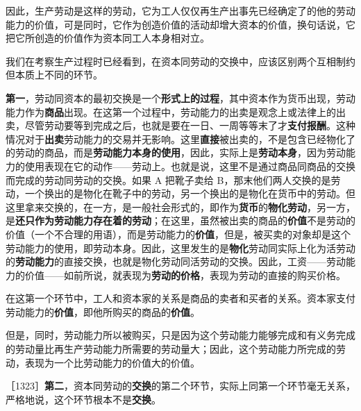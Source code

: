 因此，生产劳动是这样的劳动，它为工人仅仅再生产出事先已经确定了的他的劳动能力的价值，可是同时，它作为创造价值的活动却增大资本的价值，换句话说，它把它所创造的价值作为资本同工人本身相对立。


我们在考察生产过程时已经看到，在资本同劳动的交换中，应该区别两个互相制约但本质上不同的环节。

\textbf{第一}，劳动同资本的最初交换是一个\textbf{形式上的过程}，其中资本作为货币出现，劳动能力作为\textbf{商品}出现。在这第一个过程中，劳动能力的出卖是观念上或法律上的出卖，尽管劳动要等到完成之后，也就是要在一日、一周等等末了才\textbf{支付报酬}。这种情况对于\textbf{出卖}劳动能力的交易并无影响。这里\textbf{直接}被出卖的，不是包含已经物化了的劳动的商品，而是\textbf{劳动能力本身的使用}，因此，实际上是\textbf{劳动本身}，因为劳动能力的使用表现在它的动作——劳动上。也就是说，这里不是通过商品同商品的交换而完成的劳动同劳动的交换。如果 A 把靴子卖给 B，那末他们两人交换的是劳动，一个换出的是物化在靴子中的劳动，另一个换出的是物化在货币中的劳动。但这里拿来交换的，在一方，是一般社会形式的，即作为\textbf{货币}的\textbf{物化劳动}，另一方，是\textbf{还只作为劳动能力存在着的劳动}；在这里，虽然被出卖的商品的\textbf{价值}不是劳动的价值（一个不合理的用语），而是劳动能力的\textbf{价值}，但是，被买卖的对象却是这个劳动能力的使用，即劳动本身。因此，这里发生的是\textbf{物化}劳动同实际上化为活劳动的\textbf{劳动能力}的直接交换，也就是物化劳动同活劳动的交换。因此，工资——劳动能力的价值——如前所说，就表现为\textbf{劳动的价格}，表现为劳动的直接的购买价格。

在这第一个环节中，工人和资本家的关系是商品的卖者和买者的关系。资本家支付劳动能力的\textbf{价值}，即他所购买的商品的\textbf{价值}。

但是，同时，劳动能力所以被购买，只是因为这个劳动能力能够完成和有义务完成的劳动量比再生产劳动能力所需要的劳动量大；因此，这个劳动能力所完成的劳动，表现为一个比劳动能力的价值大的价值。

［1323］\textbf{第二}，资本同劳动的\textbf{交换}的第二个环节，实际上同第一个环节毫无关系，严格地说，这个环节根本不是\textbf{交换}。


